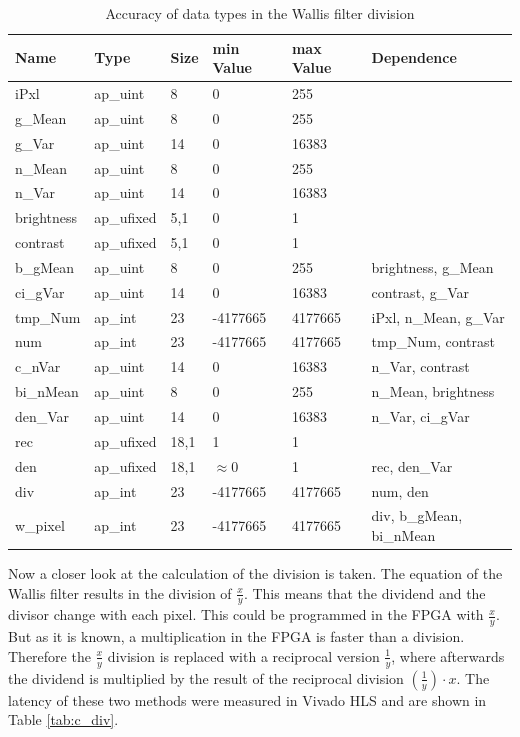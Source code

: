 \begin{table}[tb!]
    \centering
    \begin{tabularx}{\textwidth}{l l l l l l}
        \toprule
        Name & Type & Size & min Value & max Value & Dependence \\
        \midrule
        iPxl & ap\_uint & 8 & 0 & 255 & \\
        g\_Mean & ap\_uint & 8 & 0 & 255 &  \\
        g\_Var & ap\_uint & 14 & 0 & 16383 &  \\
        n\_Mean & ap\_uint & 8 & 0 & 255 &  \\
        n\_Var & ap\_uint & 14 & 0 & 16383 &  \\
        brightness & ap\_ufixed & 5,1 & 0 & 1 &  \\
        contrast & ap\_ufixed & 5,1 & 0 & 1 &  \\
        b\_gMean & ap\_uint & 8 & 0 & 255 &  brightness, g\_Mean\\
        ci\_gVar & ap\_uint & 14 & 0 & 16383 &  contrast, g\_Var\\
        tmp\_Num & ap\_int & 23 & -4177665 & 4177665 &  iPxl, n\_Mean, g\_Var \\
        num & ap\_int & 23 & -4177665 & 4177665 &  tmp\_Num, contrast \\
        c\_nVar & ap\_uint & 14 & 0 & 16383 &  n\_Var, contrast \\
        bi\_nMean & ap\_uint & 8 & 0 & 255 &  n\_Mean, brightness \\
        den\_Var & ap\_uint & 14 & 0 & 16383 &  n\_Var, ci\_gVar \\
        rec & ap\_ufixed & 18,1 & 1 & 1 &   \\
        den & ap\_ufixed & 18,1 & $\approx$0 & 1 &  rec, den\_Var \\
        div & ap\_int & 23 & -4177665 & 4177665 &  num, den \\
        w\_pixel & ap\_int & 23 & -4177665 & 4177665 &  div, b\_gMean, bi\_nMean \\
        \bottomrule
    \end{tabularx}
    \caption{Accuracy of data types in the Wallis filter division}
    \label{tab:datatypes}
\end{table}

Now a closer look at the calculation of the division is taken. The equation
of the Wallis filter results in the division of $\frac{x}{y}$. This means that
the dividend and the divisor change with each pixel. This could be programmed in
the FPGA with $\frac{x}{y}$. But as it is known, a multiplication in the FPGA is
faster than a division. Therefore the $\frac{x}{y}$ division is replaced with a
reciprocal version $\frac{1}{y}$, where afterwards the dividend is multiplied by the result of the reciprocal division $(\frac{1}{y}) \cdot x$. The latency of these two methods were measured in Vivado HLS and are shown in Table \ref{tab:c_div}. \\


